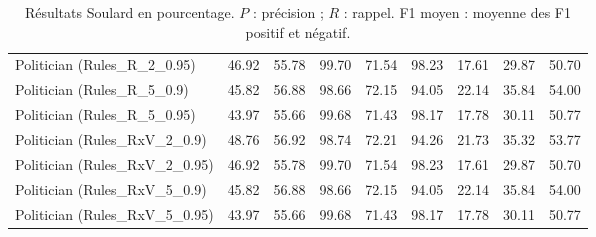 \begin{table}[htbp]
\begin{tabular}{lrrrrrrrr}
Politician (Rules\_R\_2\_0.95) & 46.92 & 55.78 & 99.70 & 71.54 & 98.23 & 17.61 & 29.87 & 50.70 \\
Politician (Rules\_R\_5\_0.9) & 45.82 & 56.88 & 98.66 & 72.15 & 94.05 & 22.14 & 35.84 & 54.00 \\
Politician (Rules\_R\_5\_0.95) & 43.97 & 55.66 & 99.68 & 71.43 & 98.17 & 17.78 & 30.11 & 50.77 \\
Politician (Rules\_RxV\_2\_0.9) & 48.76 & 56.92 & 98.74 & 72.21 & 94.26 & 21.73 & 35.32 & 53.77 \\
Politician (Rules\_RxV\_2\_0.95) & 46.92 & 55.78 & 99.70 & 71.54 & 98.23 & 17.61 & 29.87 & 50.70 \\
Politician (Rules\_RxV\_5\_0.9) & 45.82 & 56.88 & 98.66 & 72.15 & 94.05 & 22.14 & 35.84 & 54.00 \\
Politician (Rules\_RxV\_5\_0.95) & 43.97 & 55.66 & 99.68 & 71.43 & 98.17 & 17.78 & 30.11 & 50.77 \\
\hline
\end{tabular}
\caption{Résultats Soulard en pourcentage. $P$ : précision ; $R$ : rappel. F1 moyen : moyenne des F1 positif et négatif.}
\label{tab:fact-checking-soulard}
\end{table}
